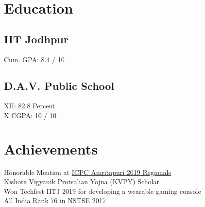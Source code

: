 \documentclass[]{deedy-resume-openfont}
\begin{document}
%
%
\lastupdated

%
%

%
%

\begin{minipage}[t]{0.33\textwidth} 


\section{Education} 

\subsection{IIT Jodhpur}
Cum. GPA: 8.4 / 10\\



\sectionsep

\subsection{D.A.V. Public School}
 XII:  82.8 Percent \\
X  CGPA: 10 / 10 

\sectionsep
\section{Achievements} 
\textbullet{} Honorable Mention at \href{https://icpc.global/ICPCID/SV747893JYP7}{ICPC Amritapuri 2019 Regionals \small{\faExternalLink}}\\
\textbullet{} Kishore Vigyanik Protsahan Yojna (KVPY) Scholar\\
\textbullet{} Won Techfest IITJ 2019 for developing a wearable gaming console\\
\textbullet{} All India Rank 76 in NSTSE 2017


\end{minipage}
\end{document}
